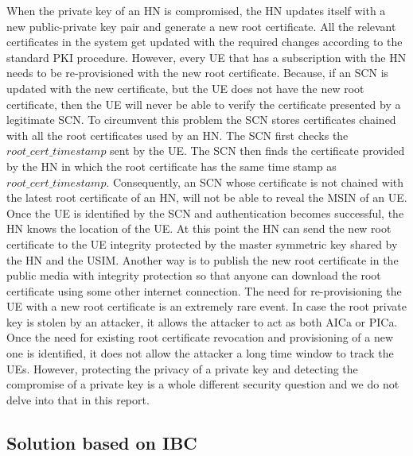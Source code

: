 \documentclass[lnicst,sechang,a4paper]{svmultln}
\begin{document}
When the private key of an HN is compromised, the HN updates itself with a new public-private key pair and generate a new root certificate. All the relevant certificates in the system get updated with the required changes according to the standard PKI procedure. However, every UE that has a subscription with the HN needs to be re-provisioned with the new root certificate. Because, if an SCN is updated with the new certificate, but the UE does not have the new root certificate, then the UE will never be able to verify the certificate presented by a legitimate SCN. To circumvent this problem the SCN stores certificates chained with all the root certificates used by an HN. The SCN first checks the $root\_cert\_timestamp$ sent by the UE. The SCN then finds the certificate provided by the HN in which the root certificate has the same time stamp as $root\_cert\_timestamp$. Consequently, an SCN whose certificate is not chained with the latest root certificate of an HN, will not be able to reveal the MSIN of an UE. Once the UE is identified by the SCN and authentication becomes successful, the HN knows the location of the UE. At this point the HN can send the new root certificate to the UE integrity protected by the master symmetric key shared by the HN and the USIM. Another way is to publish the new root certificate in the public media with integrity protection so that anyone can download the root certificate using some other internet connection. The need for re-provisioning the UE with a new root certificate is an extremely rare event. In case the root private key is stolen by an attacker, it allows the attacker to act as both AICa or PICa. Once the need for existing root certificate revocation and provisioning of a new one is identified, it does not allow the attacker a long time window to track the UEs. However, protecting the privacy of a private key and detecting the compromise of a private key is a whole different security question and we do not delve into that in this report.


\subsection{Solution based on IBC} 
\label{sub_sec:solution_ibc}
\end{document}
